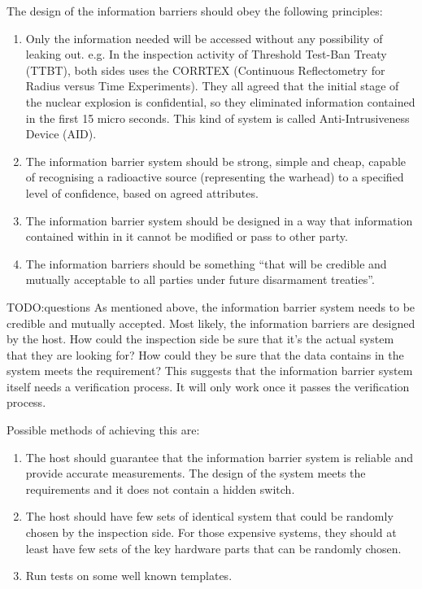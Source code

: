 \documentclass[twoside,titlepage,11pt,twocolumn,a4paper]{article}
\begin{document}
The design of the information barriers should obey the following
principles:
\begin{enumerate}
  \item Only the information needed will be accessed without any
    possibility of leaking out. e.g. In the inspection activity of
    Threshold Test-Ban Treaty (TTBT), both sides uses the CORRTEX
    (Continuous Reflectometry for Radius versus Time
    Experiments). \citep{deupree1981} They all agreed that the initial
    stage of the nuclear explosion is confidential, so they eliminated
    information contained in the first 15 micro seconds. This kind of
    system is called Anti-Intrusiveness Device (AID).
  \item The information barrier system should be strong, simple and
    cheap, capable of recognising a radioactive source (representing
    the warhead) to a specified level of confidence, based on agreed
    attributes.
  \item The information barrier system should be designed in a way
    that information contained within in it cannot be modified or pass
    to other party.
  \item The information barriers should be something ``that will be
    credible and mutually acceptable to all parties under future
    disarmament treaties''. \citep{shultz2007}
\end{enumerate}

TODO:questions
As mentioned above, the information barrier system
needs to be credible and mutually accepted. Most likely, the
information barriers are designed by the host. How could the
inspection side be sure that it's the actual system that they are
looking for? How could they be sure that the data contains in the
system meets the requirement? This suggests that the information
barrier system itself needs a verification process. It will only work
once it passes the verification process.

Possible methods of achieving this are:
\begin{enumerate}
  \item The host should guarantee that the information barrier system
    is reliable and provide accurate measurements. The design of the
    system meets the requirements and it does not contain a hidden
    switch.
  \item The host should have few sets of identical system that could
    be randomly chosen by the inspection side. For those expensive
    systems, they should at least have few sets of the key hardware
    parts that can be randomly chosen.
  \item Run tests on some well known templates.
\end{enumerate}
\end{document}
